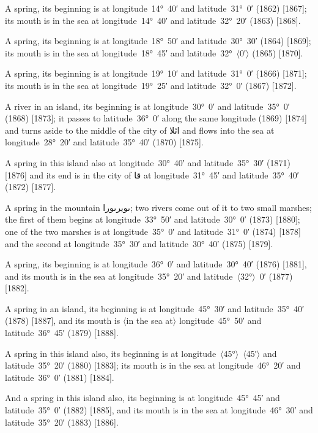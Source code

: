 \documentclass[11pt]{article}
\newcommand{\Pg}[1]{\marginpar{\footnotesize #1}}
\newcommand{\Ang}[1]{\ensuremath{#1}}
\begin{document}
A spring, its beginning is at longitude~14°~40′ and latitude~31°~0′ (1862) [1867]; its mouth is in the sea at longitude~14°~40′ and latitude~32°~20′ (1863) [1868].

A spring, its beginning is at longitude~18°~50′ and latitude~30°~30′ (1864) [1869]; its mouth is in the sea at longitude~18°~45′ and latitude~32°~\Ang{\langle}0′\Ang{\rangle} (1865) [1870].

A spring, its beginning is at longitude~19°~10′ and latitude~31°~0′ (1866) [1871]; its mouth is in the sea at longitude~19°~25′ and latitude~32°~0′ (1867) [1872].

A river in an island, its beginning is at longitude~30°~0′ and latitude~35°~0′ (1868) [1873]; it passes to latitude~36°~0′ along the same longitude (1869) [1874] and turns aside to the middle of the city of \textarabic{اثلا} and flows into the sea at longitude~28°~20′ and latitude~35°~40′ (1870) [1875].

A spring in this island also at longitude~30°~40′ and latitude~35°~30′ (1871) [1876] and its end is in the city of \textarabic{قا} at longitude~31°~45′ and latitude~35°~40′ (1872) [1877].

A spring in the mountain \textarabic{ٮويرٮورا}; two rivers come out of it to two small marshes; the first of them begins at longitude~33°~50′ and latitude~30°~0′ (1873) [1880]; one of the two marshes is at longitude~35°~0′ and latitude~31°~0′ (1874) [1878]\Pg{p. 124} and the second at longitude~35°~30′ and latitude~30°~40′ (1875) [1879].

A spring, its beginning is at longitude~36°~0′ and latitude~30°~40′ (1876) [1881], and its mouth is in the sea at longitude~35°~20′ and latitude~\Ang{\langle}32°\Ang{\rangle}~0′ (1877) [1882].

A spring in an island, its beginning is at longitude~45°~30′ and latitude~35°~40′ (1878) [1887], and its mouth is \Ang{\langle}in the sea at\Ang{\rangle} longitude~45°~50′ and latitude~36°~45′ (1879) [1888].

A spring in this island also, its beginning is at longitude~\Ang{\langle}45°\Ang{\rangle}~\Ang{\langle}45′\Ang{\rangle} and latitude~35°~20′ (1880) [1883]; its mouth is in the sea at longitude~46°~20′ and latitude~36°~0′ (1881) [1884].

And a spring in this island also, its beginning is at longitude~45°~45′ and latitude~35°~0′ (1882) [1885], and its mouth is in the sea at longitude~46°~30′ and latitude~35°~20′ (1883) [1886].
\end{document}
